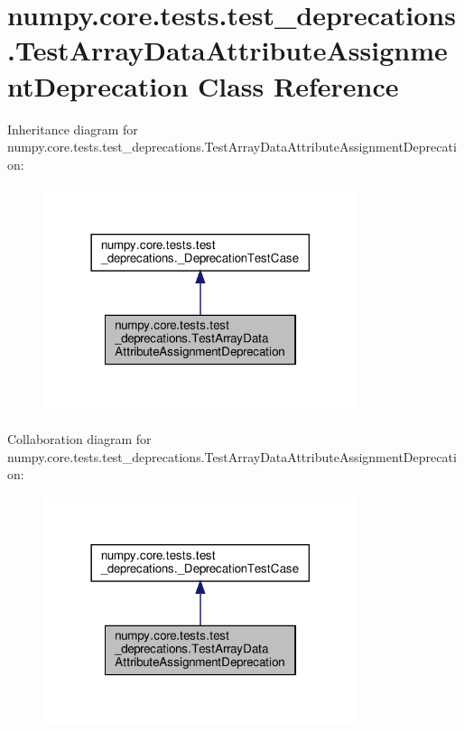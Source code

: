\hypertarget{classnumpy_1_1core_1_1tests_1_1test__deprecations_1_1TestArrayDataAttributeAssignmentDeprecation}{}\section{numpy.\+core.\+tests.\+test\+\_\+deprecations.\+Test\+Array\+Data\+Attribute\+Assignment\+Deprecation Class Reference}
\label{classnumpy_1_1core_1_1tests_1_1test__deprecations_1_1TestArrayDataAttributeAssignmentDeprecation}


Inheritance diagram for numpy.\+core.\+tests.\+test\+\_\+deprecations.\+Test\+Array\+Data\+Attribute\+Assignment\+Deprecation\+:
\nopagebreak
\begin{figure}[H]
\begin{center}
\leavevmode
\includegraphics[width=261pt]{classnumpy_1_1core_1_1tests_1_1test__deprecations_1_1TestArrayDataAttributeAssignmentDeprecation__inherit__graph}
\end{center}
\end{figure}


Collaboration diagram for numpy.\+core.\+tests.\+test\+\_\+deprecations.\+Test\+Array\+Data\+Attribute\+Assignment\+Deprecation\+:
\nopagebreak
\begin{figure}[H]
\begin{center}
\leavevmode
\includegraphics[width=261pt]{classnumpy_1_1core_1_1tests_1_1test__deprecations_1_1TestArrayDataAttributeAssignmentDeprecation__coll__graph}
\end{center}
\end{figure}

